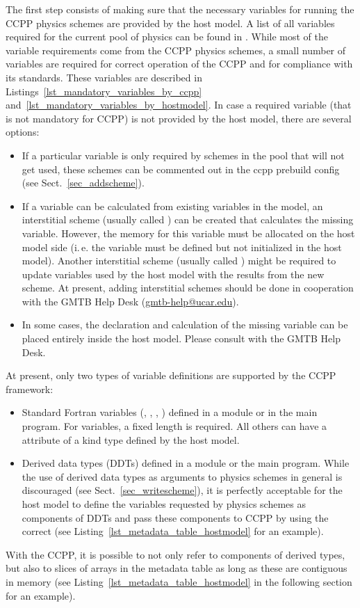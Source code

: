 The first step consists of making sure that the necessary variables for running the CCPP physics schemes are provided by the host model. A list of all variables required for the current pool of physics can be found in . While most of the variable requirements come from the CCPP physics schemes, a small number of variables are required for correct operation of the CCPP and for compliance with its standards. These variables are described in Listings~\ref{lst_mandatory_variables_by_ccpp} and~\ref{lst_mandatory_variables_by_hostmodel}. In case a required variable (that is not mandatory for CCPP) is not provided by the host model, there are several options:
\begin{itemize}
\item If a particular variable is only required by schemes in the pool that will not get used, these schemes can be commented out in the ccpp prebuild config (see Sect.~\ref{sec_addscheme}).
\item If a variable can be calculated from existing variables in the model, an interstitial scheme (usually called ) can be created that calculates the missing variable. However, the memory for this variable must be allocated on the host model side (i.\,e. the variable must be defined but not initialized in the host model). Another interstitial scheme (usually called ) might be required to update variables used by the host model with the results from the new scheme. At present, adding interstitial schemes should be done in cooperation with the GMTB Help Desk (\url{gmtb-help@ucar.edu}).
\item In some cases, the declaration and calculation of the missing variable can be placed entirely inside the host model. Please consult with the GMTB Help Desk.
\end{itemize}

At present, only two types of variable definitions are supported by the CCPP framework:
\begin{itemize}
\item Standard Fortran variables (, , , ) defined in a module or in the main program. For  variables, a fixed length is required. All others can have a  attribute of a kind type defined by the host model.
\item Derived data types (DDTs) defined in a module or the main program. While the use of derived data types as arguments to physics schemes in general is discouraged (see Sect.~\ref{sec_writescheme}), it is perfectly acceptable for the host model to define the variables requested by physics schemes as components of DDTs and pass these components to CCPP by using the correct  (see Listing~\ref{lst_metadata_table_hostmodel} for an example).
\end{itemize}
With the CCPP, it is possible to not only refer to components of derived types, but also to slices of arrays in the metadata table as long as these are contiguous in memory (see Listing~\ref{lst_metadata_table_hostmodel} in the following section for an example).

